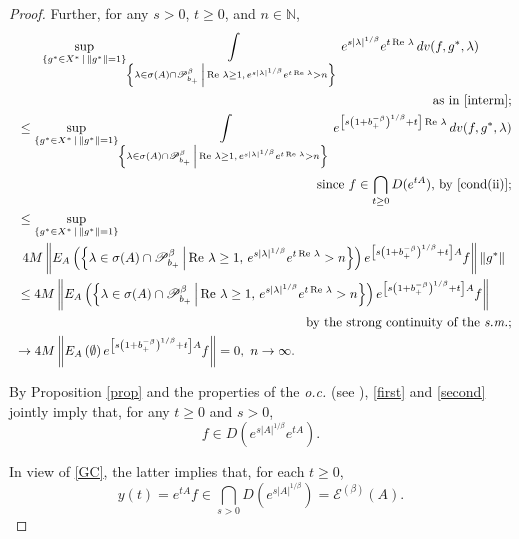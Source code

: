 \documentclass{amsart}
\theoremstyle{plain}
\theoremstyle{definition}
\begin{document}
\begin{proof}
Further, for any $s>0$, $t\ge 0$, and $n\in{{\mathbb N}}$, 
\begin{multline*}
\sup_{\{g^*\in X^*\,|\,\|g^*\|=1\}}
\int\limits_{\left\{\lambda\in\sigma(A)\cap{\mathscr P}_{b_+}^\beta\,\middle|\,\operatorname{Re\,}\lambda\ge 1,\, e^{s|\lambda|^{1/\beta}}e^{t\operatorname{Re\,}\lambda}>n\right\}}e^{s|\lambda|^{1/\beta}}e^{t\operatorname{Re\,}\lambda}\,dv(f,g^*,\lambda)
\\
\hfill
\text{as in \eqref{interm};}
\\
\shoveleft{
\le \sup_{\{g^*\in X^*\,|\,\|g^*\|=1\}}
\int\limits_{\left\{\lambda\in\sigma(A)\cap{\mathscr P}_{b_+}^\beta\,\middle|\,\operatorname{Re\,}\lambda\ge 1,\, e^{s|\lambda|^{1/\beta}}e^{t\operatorname{Re\,}\lambda}>n\right\}}e^{\left[s\left(1+b_+^{-\beta}\right)^{1/\beta}+t\right]\operatorname{Re\,}\lambda}\,dv(f,g^*,\lambda)
}\\
\hfill
\text{since $f\in \bigcap\limits_{t\ge 0}D(e^{tA})$, by \eqref{cond(ii)};}
\\
\shoveleft{
\le \sup_{\{g^*\in X^*\,|\,\|g^*\|=1\}}
}\\
\shoveleft{
4M\left\|E_A\left(\left\{\lambda\in\sigma(A)\cap{\mathscr P}_{b_+}^\beta\,\middle|\,\operatorname{Re\,}\lambda\ge 1,\, e^{s|\lambda|^{1/\beta}}e^{t\operatorname{Re\,}\lambda}>n\right\}\right)
e^{\left[s\left(1+b_+^{-\beta}\right)^{1/\beta}+t\right]A}f\right\|\|g^*\|
}\\
\shoveleft{
\le 4M\left\|E_A\left(\left\{\lambda\in\sigma(A)\cap{\mathscr P}_{b_+}^\beta\,\middle|\,\operatorname{Re\,}\lambda\ge 1,\, e^{s|\lambda|^{1/\beta}}e^{t\operatorname{Re\,}\lambda}>n\right\}\right)
e^{\left[s\left(1+b_+^{-\beta}\right)^{1/\beta}+t\right]A}f\right\|
}\\
\hfill
\text{by the strong continuity of the {\it s.m.};}
\\
\ \
\to 4M\left\|E_A\left(\emptyset\right)e^{\left[s\left(1+b_+^{-\beta}\right)^{1/\beta}+t\right]A}f\right\|=0,\ n\to\infty.
\hfill
\end{multline*}

By Proposition \ref{prop} and the properties of the \textit{o.c.} (see {\cite[Theorem XVIII.$2.11$ (f)]{Dun-SchIII}}), \eqref{first} and \eqref{second} jointly imply that, for any $t\ge 0$ and $s>0$,
\[
f\in D(e^{s|A|^{1/\beta}}e^{tA}).
\]

In view of \eqref{GC}, the latter implies that, for each $t\ge 0$, 
\begin{equation*}
y(t)=e^{tA}f\in \bigcap_{s>0} D(e^{s|A|^{1/\beta}})
={\mathscr E}^{(\beta )}(A).
\end{equation*}


\end{proof}
\end{document}
